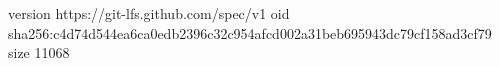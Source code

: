 version https://git-lfs.github.com/spec/v1
oid sha256:c4d74d544ea6ca0edb2396c32c954afcd002a31beb695943dc79cf158ad3cf79
size 11068
